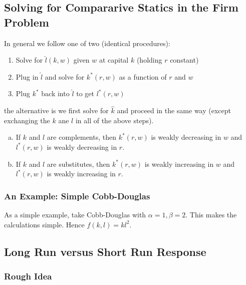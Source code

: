 \subsection{Solving for Compararive Statics in the Firm Problem}
\label{sec:solv-comp-stat-firm}


In general we follow one of two (identical procedures):

\begin{enumerate}
\item Solve for $\hat l(k,w)$ given $w$ at capital $k$ (holding $r$ constant)
\item Plug in $\hat l$ and solve for $k^*(r,w)$ as a function of $r$ and $w$
\item Plug $k^*$ back into $\hat l$ to get $l^*(r,w)$
\end{enumerate}

the alternative is we first solve for $\hat k$ and proceed in the same
way (except exchanging the $k$ ane $l$ in all of the above steps).

\begin{prop}
  \begin{enumerate}[(a)]
  \item If $k$ and $l$ are complements, then $k^*(r,w)$ is weakly
    decreasing in $w$ and $l^*(r,w)$ is weakly decreasing in $r$.
  \item If $k$ and $l$ are substitutes, then $k^*(r,w)$ is weakly
    increasing in $w$ and $l^*(r,w)$ is weakly increasing in $r$.
  \end{enumerate}
\end{prop}

\subsubsection{An Example: Simple Cobb-Douglas}

As a simple example, take Cobb-Douglas with $\alpha = 1, \beta =
2$. This makes the calculations simple. Hence $f(k,l) = kl^2$.


\subsection{Long Run versus Short Run Response}
\label{sec:LR-SR}

\subsubsection{Rough Idea}

